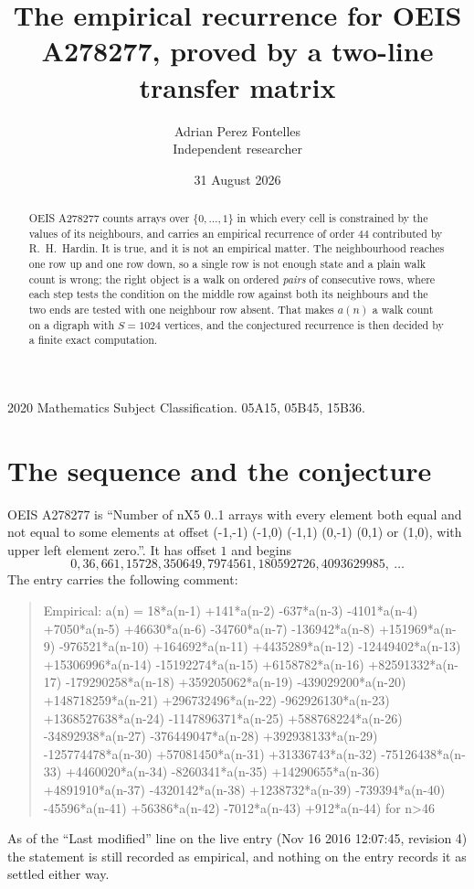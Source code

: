 \documentclass[11pt,a4paper]{article}
\title{The empirical recurrence for OEIS A278277, proved by a two-line transfer matrix}
\author{Adrian Perez Fontelles\\ \small Independent researcher}
\date{31 August 2026}
\theoremstyle{plain}
\theoremstyle{definition}
\begin{document}
\maketitle

\begin{abstract}
OEIS A278277 counts arrays over $\{0,\dots,1\}$ in which every cell is constrained by the
values of its neighbours, and carries an empirical recurrence of order $44$ contributed
by R.~H.~Hardin. It is true, and it is not an empirical matter. The neighbourhood reaches one
row up and one row down, so a single row is not enough state and a plain walk count
is wrong; the right object is a walk on ordered \emph{pairs} of consecutive rows, where
each step tests the condition on the middle row against both its neighbours and the two
ends are tested with one neighbour row absent. That makes $a(n)$ a walk count on a digraph
with $S=1024$ vertices, and the conjectured recurrence is then decided by a finite exact
computation.
\end{abstract}

\noindent\small 2020 Mathematics Subject Classification. 05A15, 05B45, 15B36.\normalsize

\section{The sequence and the conjecture}

OEIS A278277 is ``Number of nX5 0..1 arrays with every element both equal and not equal to some elements at offset (-1,-1) (-1,0) (-1,1) (0,-1) (0,1) or (1,0), with upper left element zero.''. It has offset $1$ and begins
\[
0, 36, 661, 15728, 350649, 7974561, 180592726, 4093629985,\ \dots
\]
The entry carries the following comment:
\begin{quote}\small
Empirical: a(n) = 18*a(n-1) +141*a(n-2) -637*a(n-3) -4101*a(n-4) +7050*a(n-5) +46630*a(n-6) -34760*a(n-7) -136942*a(n-8) +151969*a(n-9) -976521*a(n-10) +164692*a(n-11) +4435289*a(n-12) -12449402*a(n-13) +15306996*a(n-14) -15192274*a(n-15) +6158782*a(n-16) +82591332*a(n-17) -179290258*a(n-18) +359205062*a(n-19) -439029200*a(n-20) +148718259*a(n-21) +296732496*a(n-22) -962926130*a(n-23) +1368527638*a(n-24) -1147896371*a(n-25) +588768224*a(n-26) -34892938*a(n-27) -376449047*a(n-28) +392938133*a(n-29) -125774478*a(n-30) +57081450*a(n-31) +31336743*a(n-32) -75126438*a(n-33) +4460020*a(n-34) -8260341*a(n-35) +14290655*a(n-36) +4891910*a(n-37) -4320142*a(n-38) +1238732*a(n-39) -739394*a(n-40) -45596*a(n-41) +56386*a(n-42) -7012*a(n-43) +912*a(n-44) for n>46
\end{quote}
As of the ``Last modified'' line on the live entry (Nov 16 2016 12:07:45, revision 4) the statement is
still recorded as empirical, and nothing on the entry records it as settled either way.
\end{document}
